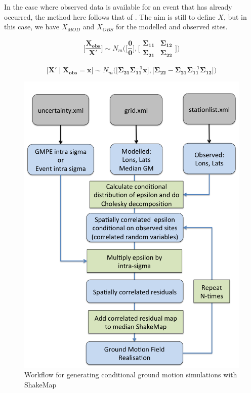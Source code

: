 \documentclass[11pt, oneside]{article}   	%
\begin{document}
In the case where observed data is available for an event that has already occurred, the method here follows that of \citet{park2007}. The aim is still to define $X$, but in this case, we have $X_{MOD}$ and $X_{OBS}$ for the modelled and observed sites. 

\begin{equation}
\Bigg [ \frac{\bm{X_{obs}} }{\bm{X'}} \Bigg ] \sim N_m \Bigg( \Bigg [ \frac{\bm{0}}{\bm{0}} \Bigg] , \Bigg[  \begin{array}{c|c}
  \bm{\Sigma_{11} } & \bm{\Sigma_{12}} \\
  \hline
  \bm{\Sigma_{21}} & \bm{\Sigma_{22}}
 \end{array} \Bigg]  \Bigg)
\end{equation}

\begin{equation}
\Big [ \bm{X'} \mid \bm{X_{obs}} =  \bm{x} \Big ] \sim N_m \Big (  \Big [   \bm{\Sigma_{21}} \bm{\Sigma_{11}^{-1}} \bm{x} \Big ] , \Big [  \bm{\Sigma_{22}} -  \bm{\Sigma_{21}} \bm{\Sigma_{11}^{-1}} \bm{\Sigma_{12}} \Big ] \Big)
\end{equation}

\begin{figure}
\includegraphics[width = 6in]{workflow.png}
\caption{Workflow for generating conditional ground motion simulations with ShakeMap}
\end{figure}
\end{document}
